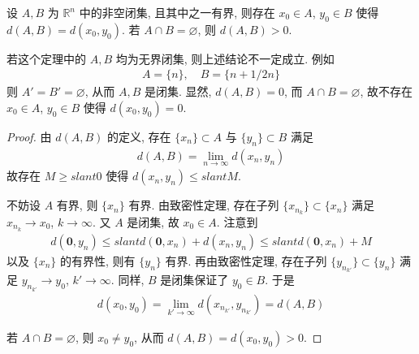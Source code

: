 \documentclass[../../main.tex]{subfiles}
\begin{document}
\begin{theorem}
设 $A, B$ 为 $\mathbb{R}^n$ 中的非空闭集, 且其中之一有界, 则存在 $x_0 \in A$, $y_0 \in B$ 使得 $d(A, B) = d(x_0, y_0)$. 若 $A \cap B = \varnothing$, 则 $d(A, B) > 0$.
\end{theorem}
\begin{remark}
若这个定理中的 $A, B$ 均为无界闭集, 则上述结论不一定成立. 例如
\begin{align*}
A = \{n\}, \quad B = \{n + 1/2n\}
\end{align*}
则 $A' = B' = \varnothing$, 从而 $A, B$ 是闭集. 显然, $d(A, B) = 0$, 而 $A \cap B = \varnothing$, 故不存在 $x_0 \in A$, $y_0 \in B$ 使得 $d(x_0, y_0) = 0$.
\end{remark}
\begin{proof}
由 $d(A, B)$ 的定义, 存在 $\{x_n\} \subset A$ 与 $\{y_n\} \subset B$ 满足
\begin{align*}
d(A, B) = \lim_{n \to \infty} d(x_n, y_n)
\end{align*}
故存在 $M \geqslant slant 0$ 使得 $d(x_n, y_n) \leqslant slant M$.

不妨设 $A$ 有界, 则 $\{x_n\}$ 有界. 由致密性定理, 存在子列 $\{x_{n_k}\} \subset \{x_n\}$ 满足 $x_{n_k} \to x_0$, $k \to \infty$. 又 $A$ 是闭集, 故 $x_0 \in A$. 注意到
\begin{align*}
d(\mathbf{0}, y_n) \leqslant slant d(\mathbf{0}, x_n) + d(x_n, y_n) \leqslant slant d(\mathbf{0}, x_n) + M
\end{align*}
以及 $\{x_n\}$ 的有界性, 则有 $\{y_n\}$ 有界. 再由致密性定理, 存在子列 $\{y_{n_{k'}}\} \subset \{y_n\}$ 满足 $y_{n_{k'}} \to y_0$, $k' \to \infty$. 同样, $B$ 是闭集保证了 $y_0 \in B$. 于是
\begin{align*}
d(x_0, y_0) = \lim_{k' \to \infty} d(x_{n_{k'}}, y_{n_{k'}}) = d(A, B)
\end{align*}

若 $A \cap B = \varnothing$, 则 $x_0 \neq y_0$, 从而 $d(A, B) = d(x_0, y_0) > 0$.
\end{proof}
\end{document}
